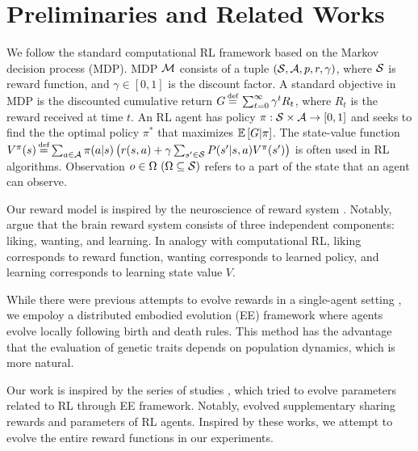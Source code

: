 \section{Preliminaries and Related Works}\label{sec:related}
We follow the standard computational RL framework \citep{suttonReinforcementLearningIntroduction2018} based on the Markov decision process (MDP). MDP $\mathcal{M}{}$ consists of a tuple $(\mathcal{S}{}, \mathcal{A}{}, p, r, \gamma)$, where $\mathcal{S}{}$ is reward function, and $\gamma \in [0, 1]$ is the discount factor. A standard objective in MDP is the discounted cumulative return $G \defequal{} \sum_{t=0}^{\infty}\gamma^t R_{t}$, where $R_t$ is the reward received at time $t$. An RL agent has policy $\pi: \mathcal{S} \times \mathcal{A} \rightarrow [0, 1]$ and seeks to find the the optimal policy $\pi^{*}$ that maximizes $\mathbb{E} \left[G|\pi\right]$. The state-value function $V^\pi(s) \defequal \sum_{a \in \A} \pi(a|s) \left( r(s, a) + \gamma \sum_{s' \in \X} P(s'|s, a) V^\pi(s') \right)$ is often used in RL algorithms. Observation $o \in \Omega~(\Omega \subseteq \mathcal{S})$ refers to a part of the state that an agent can observe.

Our reward model is inspired by the neuroscience of reward system \citep{schultzNeuronalRewardDecision2015, berridgePleasureSystemsBrain2015}. Notably, \citet{berridgeDissectingComponentsReward2009} argue that the brain reward system consists of three independent components: liking, wanting, and learning. In analogy with computational RL, liking corresponds to reward function, wanting corresponds to learned policy, and learning corresponds to learning state value $V$.

While there were previous attempts to evolve rewards in a single-agent setting \citep{singhWhereRewardsCome2009,niekumEvolutionRewardFunctions2011,zhengWhatCanLearned2020},
we empoloy a distributed embodied evolution (EE) framework \citep{watsonEmbodiedEvolutionDistributing2002,bredecheEmbodiedEvolutionCollective2018}
where agents evolve locally following birth and death rules. This method has the advantage that the evaluation of genetic traits depends on population dynamics, which is more natural.

Our work is inspired by the series of studies \citep{elfwingBiologicallyInspiredEmbodied2005,elfwingDarwinianEmbodiedEvolution2011,elfwingEmergencePolymorphicMating2014}, which tried to evolve parameters related to RL through EE framework. Notably, \citet{elfwingDarwinianEmbodiedEvolution2011} evolved supplementary sharing rewards and parameters of RL agents.
Inspired by these works, we attempt to evolve the entire reward functions in our experiments.

